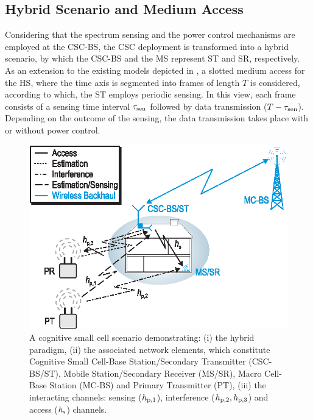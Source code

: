 \subsection{Hybrid Scenario and Medium Access}
Considering that the spectrum sensing and the power control mechanisms are employed at the CSC-BS, the CSC deployment is transformed into a hybrid scenario, by which the CSC-BS and the MS represent ST and SR, respectively. As an extension to the existing models depicted in \cite{Kang09, Sharma14}, a slotted medium access for the HS, where the time axis is segmented into frames of length $T$ is considered, according to which, the ST employs periodic sensing. In this view, each frame consists of a sensing time interval $\tau_{\text{sen}}$ followed by data transmission ($T - \tau_{\text{sen}}$). Depending on the outcome of the sensing, the data transmission takes place  with or without power control. 
\begin{figure}[!t]
\centering
\includegraphics[width = \figscalet]{figures/CR_Scenario_Hybrid}
\caption{A cognitive small cell scenario demonstrating: (i) the hybrid paradigm, (ii) the associated network elements, which constitute Cognitive Small Cell-Base Station/Secondary Transmitter (CSC-BS/ST), Mobile Station/Secondary Receiver (MS/SR), Macro Cell-Base Station (MC-BS) and Primary Transmitter (PT), (iii) the interacting channels: sensing ($h_{\text{p,1}}$), interference ($h_{\text{p,2}}, h_{\text{p,3}}$) and access ($h_{\text{s}}$) channels.}
\label{fig_HS:scenario}
\end{figure}

